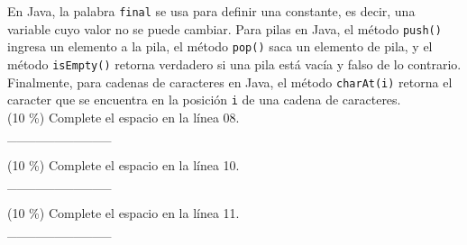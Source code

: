 \documentclass[twocolumn]{article}
\begin{document}
En Java, la palabra \texttt{final} se usa para definir una constante, es decir, 
una variable cuyo valor no se puede cambiar. Para pilas en Java,
el método \texttt{push()} ingresa un elemento a la pila, el método \texttt{pop()}
saca un elemento de pila, y el método \texttt{isEmpty()} retorna verdadero si 
una pila está vacía y falso de lo contrario. Finalmente, para cadenas
de caracteres en Java, el método \texttt{charAt(i)} retorna el caracter que se
encuentra en la posición \texttt{i} de una cadena de caracteres. \\

(10 \%) Complete el espacio en la línea 08.\\

\_\_\_\_\_\_\_\_\_\_\_\ 

(10 \%) Complete el espacio en la línea 10.\\

\_\_\_\_\_\_\_\_\_\_\_\ 

(10 \%) Complete el espacio en la línea 11.\\

\_\_\_\_\_\_\_\_\_\_\_\ 

\end{document}
